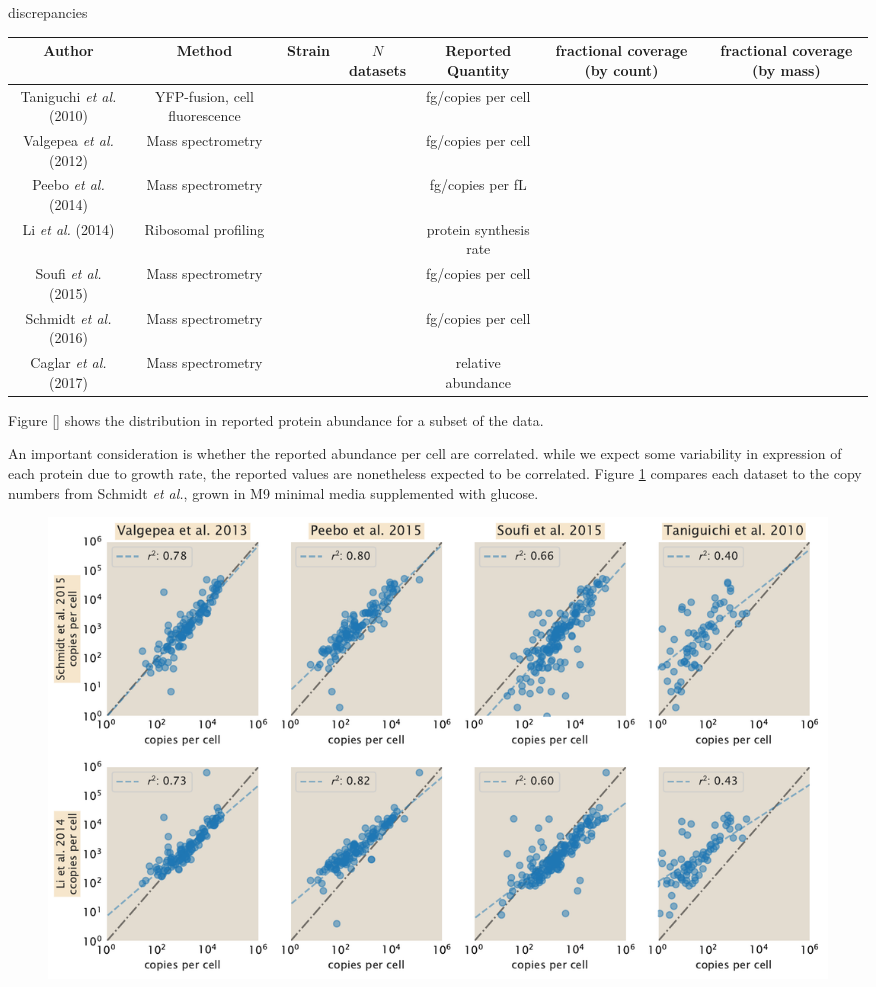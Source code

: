 discrepancies \documentclass[11pt, letterpaper]{article}
\begin{document}
\begin{tabularx}{.8\textwidth}{ || c | c | c | c | c | c | c || }
\hline
Author & Method & Strain & $N$ datasets & Reported Quantity & fractional coverage (by count) & fractional coverage (by mass) \\
\hline\hline
Taniguchi {\it et al.} (2010) & YFP-fusion, cell fluorescence  & & & fg/copies per cell & & \\
\hline
Valgepea {\it et al.} (2012) & Mass spectrometry  & & & fg/copies per cell & & \\
\hline
Peebo {\it et al.} (2014) & Mass spectrometry  & & & fg/copies per fL & & \\
\hline
Li {\it et al.} (2014) & Ribosomal profiling  & & & protein synthesis rate & & \\
\hline
Soufi {\it et al.} (2015) & Mass spectrometry  & & & fg/copies per cell & &\\
\hline
Schmidt {\it et al.} (2016) & Mass spectrometry  & & & fg/copies per cell & & \\
\hline
Caglar {\it et al.} (2017) & Mass spectrometry  & & & relative abundance & &\\
\hline
\end{tabularx}

Figure \ref{} shows the distribution in reported protein abundance for   a  subset
of  the data.

An important consideration is whether the reported abundance per cell are correlated. while
we expect some variability in expression of each protein due to growth rate, the reported
values are nonetheless expected to be correlated. Figure \ref{fig:dataset_correlations} compares each dataset to the copy numbers from Schmidt {\it et al.}, grown in M9 minimal media supplemented with glucose.

\begin{figure}[H]
		\centering
    \includegraphics[width=1\textwidth]{../../figures/dataset_correlations.pdf}
  \caption{}
  \label{fig:dataset_correlations}
\end{figure}
\end{document}
